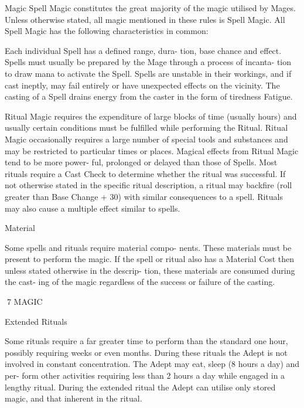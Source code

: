 \begin{Chapter}{Magic}
Spell  Magic  constitutes  the  great  majority  of  the 
magic  utilised  by  Mages.  Unless  otherwise  stated, 
all  magic mentioned in these  rules  is  Spell  Magic. 
All Spell Magic has the following characteristics in 
common: 

Each  individual  Spell  has  a  defined  range,  dura-
tion, base chance and effect. Spells must usually be 
prepared by the Mage through a process of incanta-
tion to  draw  mana to  activate  the  Spell.  Spells  are 
unstable in their workings, and if cast ineptly, may 
fail  entirely  or  have  unexpected  effects  on  the 
vicinity. The casting of a Spell drains energy from 
the caster in the form of tiredness Fatigue. 

Ritual  Magic  requires  the  expenditure  of  large 
blocks  of  time  (usually  hours)  and  usually  certain 
conditions  must  be  fulfilled  while  performing  the 
Ritual.  Ritual  Magic  occasionally  requires  a  large 
number of special tools and substances and may be 
restricted  to  particular  times  or  places.  Magical 
effects  from Ritual  Magic tend  to be  more  power-
ful,  prolonged  or  delayed  than  those  of  Spells. 
Most  rituals  require  a  Cast  Check  to  determine 
whether  the  ritual  was  successful.  If  not  otherwise 
stated in the specific ritual description, a ritual may 
backfire (roll greater than Base Change + 30) with 
similar  consequences  to  a  spell.  Rituals  may  also 
cause a multiple effect similar to spells. 

Material 

Some  spells  and  rituals  require  material  compo-
nents.  These  materials  must  be  present  to  perform 
the magic.  If the spell or ritual also has a Material 
Cost  then  unless  stated  otherwise  in  the  descrip-
tion, these materials are consumed during the cast-
ing of the magic regardless of the success or failure 
of the casting. 

7 MAGIC 

Extended Rituals 

Some  rituals  require  a  far  greater  time  to  perform 
than  the  standard  one  hour,  possibly  requiring 
weeks  or  even  months.  During  these  rituals  the 
Adept  is  not  involved  in  constant  concentration. 
The Adept may eat, sleep (8 hours a day) and per-
form  other  activities  requiring  less  than  2  hours  a 
day  while  engaged  in  a  lengthy  ritual.  During  the 
extended  ritual  the  Adept  can  utilise  only  stored 
magic, and that inherent in the ritual. 


\end{Chapter}
